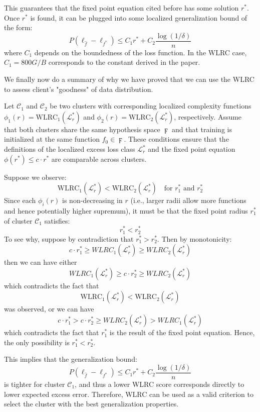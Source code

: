 \documentclass{article}
\begin{document}
This guarantees that the fixed point equation cited before has some solution $r^*$.
Once $r^*$ is found, it can be plugged into some localized generalization bound of the form:
\[
P(\ell_{\hat{f}} - \ell_{f^*}) \leq C_1 r^* + C_2 \frac{\log(1/\delta)}{n}
\]
where $C_1$ depends on the boundedness of the loss function. In the WLRC case, 
$C_1 = 800G / B$ corresponds to the constant derived in the paper. 



We finally now do a summary of why we have proved that we can use the WLRC to assess client's "goodness" of data distribution.

Let \( \mathcal{C}_1 \) and \( \mathcal{C}_2 \) be two clusters with corresponding localized complexity functions \( \phi_1(r) = \text{WLRC}_1(\mathcal{L}_r^*) \) and \( \phi_2(r) = \text{WLRC}_2(\mathcal{L}_r^*) \), respectively. Assume that both clusters share the same hypothesis space \( \digamma \) and that training is initialized at the same function \( f_0 \in \digamma \). These conditions ensure that the definitions of the localized excess loss class \( \mathcal{L}_r^* \) and the fixed point equation \( \phi(r^*) \leq c \cdot r^* \) are comparable across clusters.

Suppose we observe:
\[
\text{WLRC}_1(\mathcal{L}_r^*) < \text{WLRC}_2(\mathcal{L}_r^*) \quad \text{for } r_1^* \text{ and } r_2^*
\]
Since each \( \phi_i(r) \) is non-decreasing in \( r \) (i.e., larger radii allow more functions and hence potentially higher supremum), it must be that the fixed point radius \( r_1^* \) of cluster \( \mathcal{C}_1 \) satisfies:
\[
r_1^* < r_2^*
\]
To see why, suppose by contradiction that \( r_1^* > r_2^* \). Then by monotonicity:
\[
c \cdot r_1^* \geq WLRC_1(\mathcal{L}_r^*) \geq WLRC_2(\mathcal{L}_r^*) 
\]
then we can have either
\[
WLRC_1(\mathcal{L}_r^*) \geq c \cdot r_2^* \geq  WLRC_2(\mathcal{L}_r^*)
\]
which contradicts the fact that \[
\text{WLRC}_1(\mathcal{L}_r^*) < \text{WLRC}_2(\mathcal{L}_r^*) 
\]
was observed, or we can have \[
 c \cdot r_1^* > c \cdot r_2^* \geq WLRC_2(\mathcal{L}_r^*)  > WLRC_1(\mathcal{L}_r^*) 
\]
which contradicts the fact that \( r_1^* \) is the result of the fixed point equation. Hence, the only possibility is \( r_1^* < r_2^* \).

This implies that the generalization bound:
\[
P(\ell_{\hat{f}} - \ell_{f^*}) \leq C_1 r^* + C_2 \frac{\log(1/\delta)}{n}
\]
is tighter for cluster \( \mathcal{C}_1 \), and thus a lower WLRC score corresponds directly to lower expected excess error. Therefore, WLRC can be used as a valid criterion to select the cluster with the best generalization properties.
\end{document}
